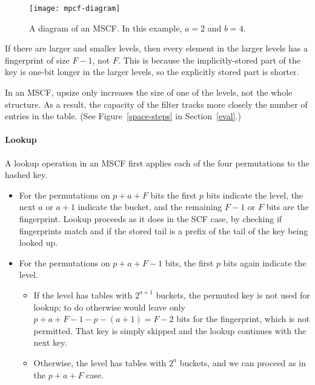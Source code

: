 \documentclass[letterpaper,twocolumn,10pt]{article}
\newcommand{\ints}{\mathbb{Z}}
\newcommand{\dotcup}{\ensuremath{\mathaccent\cdot\cup}}
\newcommand{\TCF}{SCF}
\newcommand{\MTCF}{MSCF}
\newcommand{\TCF}{TCF}
\newcommand{\MTCF}{MTCF}
\begin{document}
\begin{figure}[b!]
  \texttt{[image: mpcf-diagram]}
\caption{\label{mtcf-diagram}
A diagram of an \MTCF{}.
In this example, $a = 2$ and $b=4$.
}
\end{figure}

If there are larger and smaller levels, then every element in the larger levels has a fingerprint of size $F-1$, not $F$.
This is because the implicitly-stored part of the key is one-bit longer in the larger levels, so the explicitly stored part is shorter.

In an \MTCF{}, upsize only increases the size of one of the levels, not the whole structure.
As a result, the capacity of the filter tracks more closely the number of entries in the table. (See Figure~\ref{space-steps} in Section~\ref{eval}.)

\paragraph{Lookup}
A lookup operation in an \MTCF{} first applies each of the four permutations to the hashed key.
\begin{itemize}
\item For the permutations on $p + a + F$ bits %
the first $p$ bits indicate the level, %
the next $a$ or $a+1$ indicate the bucket, %
and the remaining $F-1$ or $F$ bits are the fingerprint.
Lookup proceeds as it does in the \TCF{} case, by checking if fingerprints match and if the stored tail is a prefix of the tail of the key being looked up. %
\item For the permutations on $p + a + F - 1$ bits, the first $p$ bits again indicate the level. %
\begin{itemize}
\item If the level has tables with $2^{a+1}$ buckets, the permuted key is not used for lookup; to do otherwise would leave only $p + a + F - 1 - p - (a+1) = F-2$ bits for the fingerprint, which is not permitted.
That key is simply skipped and the lookup continues with the next key. %
\item Otherwise, the level has tables with $2^a$ buckets, and we can proceed as in the $p+a+F$ case. %
\end{itemize}
\end{itemize}
\end{document}
